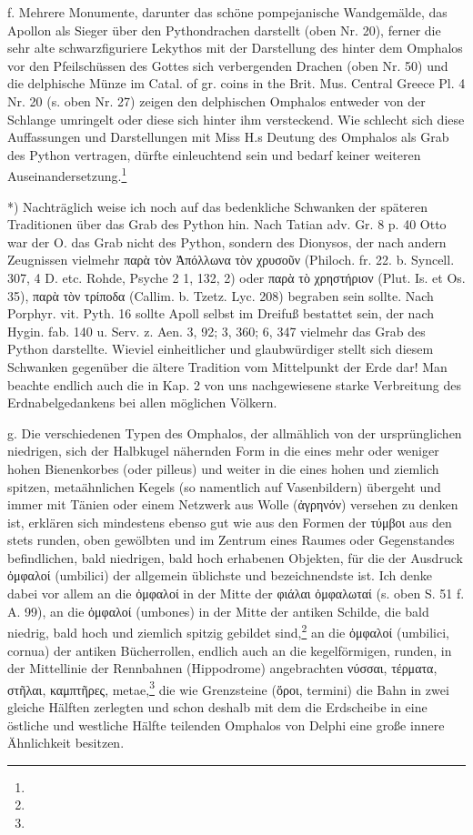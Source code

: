\documentclass[a4paper, 11pt, oneside]{article}
\begin{document}
f. Mehrere Monumente, darunter das schöne pompejanische Wandgemälde, das Apollon als Sieger über den Pythondrachen darstellt (oben Nr. 20), ferner die sehr alte schwarzfiguriere Lekythos mit der Darstellung des hinter dem Omphalos vor den Pfeilschüssen des Gottes sich verbergenden Drachen (oben Nr. 50) und die delphische Münze im Catal. of gr. coins in the Brit. Mus. Central Greece Pl. 4 Nr. 20 (s. oben Nr. 27) zeigen den delphischen Omphalos entweder von der Schlange umringelt oder diese sich hinter ihm versteckend. Wie schlecht sich diese Auffassungen und Darstellungen mit Miss H.s Deutung des Omphalos als Grab des Python vertragen, dürfte einleuchtend sein und bedarf keiner weiteren Auseinandersetzung.\footnote{}

*) Nachträglich weise ich noch auf das bedenkliche Schwanken der späteren Traditionen über das Grab des Python hin. Nach Tatian adv. Gr. 8 p. 40 Otto war der O. das Grab nicht des Python, sondern des Dionysos, der nach andern Zeugnissen vielmehr παρὰ τὸν Ἀπόλλωνα τὸν χρυσοῦν (Philoch. fr. 22. b. Syncell. 307, 4 D. etc. Rohde, Psyche 2 1, 132, 2) oder παρὰ τὸ χρηστήριον (Plut. Is. et Os. 35), παρὰ τὸν τρίποδα (Callim. b. Tzetz. Lyc. 208) begraben sein sollte. Nach Porphyr. vit. Pyth. 16 sollte Apoll selbst im Dreifuß bestattet sein, der nach Hygin. fab. 140 u. Serv. z. Aen. 3, 92; 3, 360; 6, 347 vielmehr das Grab des Python darstellte. Wieviel einheitlicher und glaubwürdiger stellt sich diesem Schwanken gegenüber die ältere Tradition vom Mittelpunkt der Erde dar! Man beachte endlich auch die in Kap. 2 von uns nachgewiesene starke Verbreitung des Erdnabelgedankens bei allen möglichen Völkern.

g. Die verschiedenen Typen des Omphalos, der allmählich von der ursprünglichen niedrigen, sich der Halbkugel nähernden Form in die eines mehr oder weniger hohen Bienenkorbes (oder pilleus) und weiter in die eines hohen und ziemlich spitzen, metaähnlichen Kegels (so namentlich auf Vasenbildern) übergeht und immer mit Tänien oder einem Netzwerk aus Wolle (ἀγρηνόν) versehen zu denken ist, erklären sich mindestens ebenso gut wie aus den Formen der τύμβοι aus den stets runden, oben gewölbten und im Zentrum eines Raumes oder Gegenstandes befindlichen, bald niedrigen, bald hoch erhabenen Objekten, für die der Ausdruck ὀμφαλοί (umbilici) der allgemein üblichste und bezeichnendste ist. Ich denke dabei vor allem an die ὀμφαλοί in der Mitte der φιάλαι ὀμφαλωταί (s. oben S. 51 f. A. 99), an die ὀμφαλοί (umbones) in der Mitte der antiken Schilde, die bald niedrig, bald hoch und ziemlich spitzig gebildet sind,\footnote{} an die ὀμφαλοί (umbilici, cornua) der antiken Bücherrollen, endlich auch an die kegelförmigen, runden, in der Mittellinie der Rennbahnen (Hippodrome) angebrachten νύσσαι, τέρματα, στῆλαι, καμπτῆρες, metae,\footnote{} die wie Grenzsteine (ὅροι, termini) die Bahn in zwei gleiche Hälften zerlegten und schon deshalb mit dem die Erdscheibe in eine östliche und westliche Hälfte teilenden Omphalos von Delphi eine große innere Ähnlichkeit besitzen.
\end{document}
